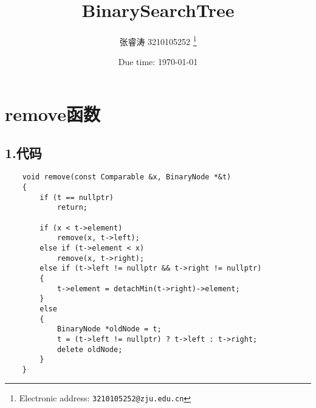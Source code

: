 \documentclass[a4paper]{article}
\begin{document}
\title{BinarySearchTree}

\author{张睿涛 3210105252
  \thanks{Electronic address: \texttt{3210105252@zju.edu.cn}}}


\date{Due time: \today}
\maketitle
\section*{remove函数}
\subsection*{1.代码}
\begin{lstlisting}
    void remove(const Comparable &x, BinaryNode *&t)
    {
        if (t == nullptr)
            return; 

        if (x < t->element)
            remove(x, t->left);
        else if (t->element < x)
            remove(x, t->right);
        else if (t->left != nullptr && t->right != nullptr) 
        {
            t->element = detachMin(t->right)->element;
        }
        else
        {
            BinaryNode *oldNode = t;
            t = (t->left != nullptr) ? t->left : t->right;
            delete oldNode;
        }
    }
\end{lstlisting}
\end{document}
